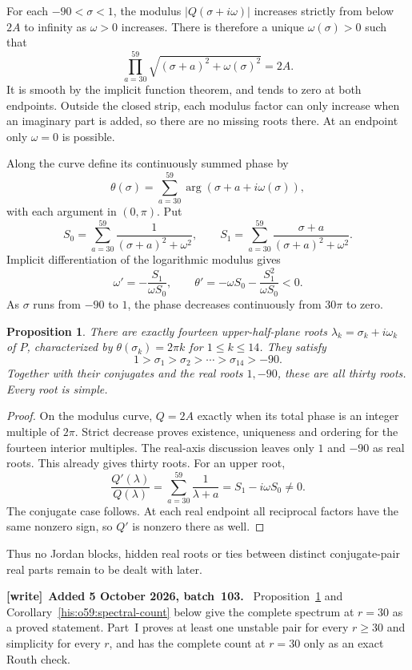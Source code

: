 \documentclass[11pt]{article}
\newtheorem{proposition}[theorem]{Proposition}
\theoremstyle{remark}\newtheorem{remark}[theorem]{Remark}
\numberwithin{equation}{section}
\newenvironment{writenote}[1][]{\par\smallskip\begingroup\small
 \noindent\textbf{[write]}\if\relax\detokenize{#1}\relax\else~\textbf{#1.}\fi\ }%
 {\par\endgroup\smallskip}
\begin{document}
For each $-90<\sigma<1$, the modulus
$|Q(\sigma+i\omega)|$ increases strictly from below $2A$ to infinity
as $\omega>0$ increases. There is therefore a unique $\omega(\sigma)>0$
such that
\begin{equation}\label{his:o59:modulus-curve}
\prod_{a=30}^{59}\sqrt{(\sigma+a)^2+\omega(\sigma)^2}=2A.
\end{equation}
It is smooth by the implicit function theorem, and tends to zero at
both endpoints. Outside the closed strip, each modulus factor can
only increase when an imaginary part is added, so there are no missing
roots there. At an endpoint only $\omega=0$ is possible.

Along the curve define its continuously summed phase by
\[
\theta(\sigma)=\sum_{a=30}^{59}\arg(\sigma+a+i\omega(\sigma)),
\]
with each argument in $(0,\pi)$. Put
\[
S_0=\sum_{a=30}^{59}\frac1{(\sigma+a)^2+\omega^2},\qquad
S_1=\sum_{a=30}^{59}\frac{\sigma+a}{(\sigma+a)^2+\omega^2}.
\]
Implicit differentiation of the logarithmic modulus gives
\begin{equation}\label{his:o59:phase-monotonicity}
\omega'=-\frac{S_1}{\omega S_0},\qquad
\theta'=-\omega S_0-\frac{S_1^2}{\omega S_0}<0.
\end{equation}
As $\sigma$ runs from $-90$ to $1$, the phase decreases continuously
from $30\pi$ to zero.

\begin{proposition}\label{his:o59:spectrum-order}
There are exactly fourteen upper-half-plane roots
$\lambda_k=\sigma_k+i\omega_k$ of $P$, characterized by
$\theta(\sigma_k)=2\pi k$ for $1\le k\le14$. They satisfy
\begin{equation}\label{his:o59:ordering}
1>\sigma_1>\sigma_2>\cdots>\sigma_{14}>-90.
\end{equation}
Together with their conjugates and the real roots $1,-90$, these are
all thirty roots. Every root is simple.
\end{proposition}
\begin{proof}
On the modulus curve, $Q=2A$ exactly when its total phase is an integer
multiple of $2\pi$. Strict decrease proves existence, uniqueness and
ordering for the fourteen interior multiples. The real-axis discussion
leaves only $1$ and $-90$ as real roots. This already gives thirty
roots. For an upper root,
\[
\frac{Q'(\lambda)}{Q(\lambda)}
=\sum_{a=30}^{59}\frac1{\lambda+a}=S_1-i\omega S_0\ne0.
\]
The conjugate case follows. At each real endpoint all reciprocal
factors have the same nonzero sign, so $Q'$ is nonzero there as well.
\end{proof}
Thus no Jordan blocks, hidden real roots or ties between distinct
conjugate-pair real parts remain to be dealt with later.
\begin{writenote}[Added 5 October 2026, batch~103]
Proposition~\ref{his:o59:spectrum-order} and Corollary~\ref{his:o59:spectral-count} below give the complete spectrum at $r=30$ as a proved statement. Part~I proves at least one unstable pair for every $r\ge30$ and simplicity for every $r$, and has the complete count at $r=30$ only as an exact Routh check.
\end{writenote}
\end{document}
